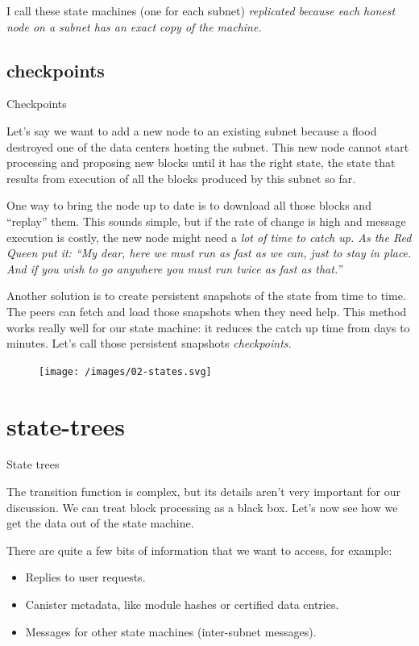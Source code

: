 \documentclass{article}
\begin{document}
I call these state machines (one for each subnet) \em{replicated} because each honest node on a subnet has an exact copy of the machine.

\subsection{checkpoints}{Checkpoints}

Let's say we want to add a new node to an existing subnet because a flood destroyed one of the data centers hosting the subnet.
This new node cannot start processing and proposing new blocks until it has the right state, the state that results from execution of all the blocks produced by this subnet so far.

One way to bring the node up to date is to download all those blocks and ``replay'' them.
This sounds simple, but if the rate of change is high and message execution is costly, the new node might need a \em{lot} of time to catch up.
As the Red Queen put it: ``My dear, here we must run as fast as we can, just to stay in place.
And if you wish to go anywhere you must run twice as fast as that.''

Another solution is to create persistent snapshots of the state from time to time.
The peers can fetch and load those snapshots when they need help.
This method works really well for our state machine: it reduces the catch up time from days to minutes.
Let's call those persistent snapshots \em{checkpoints}.

\begin{figure}[grayscale-diagram]
\texttt{[image: /images/02-states.svg]}
\end{figure}

\section{state-trees}{State trees}

The transition function is complex, but its details aren't very important for our discussion.
We can treat block processing as a black box.
Let's now see how we get the data out of the state machine.

There are quite a few bits of information that we want to access, for example:
\begin{itemize}
\item Replies to user requests.
\item Canister metadata, like module hashes or certified data entries.
\item Messages for other state machines (inter-subnet messages).
\end{itemize}
\end{document}
